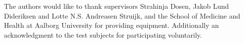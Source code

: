 \begin{multicols}{2}
	The authors would like to thank supervisors Strahinja Dosen, Jakob Lund Dideriksen and Lotte N.S. Andreasen Struijk, and the School of Medicine and Health at Aalborg University for providing equipment. Additionally an acknowledgment to the test subjects for participating voluntarily.
	
	

\end{multicols}
